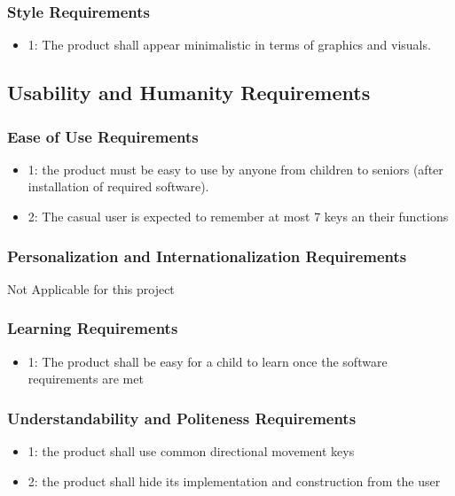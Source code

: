 \documentclass[12pt]{article}
\begin{document}
\subsubsection*{Style Requirements}
\begin{itemize}
\item 1: The product shall appear minimalistic in terms of graphics and visuals.
\end{itemize}

\subsection{Usability and Humanity Requirements}
\subsubsection*{Ease of Use Requirements}
\begin{itemize}
\item 1: the product must be easy to use by anyone from children to seniors (after installation of required software).
\item 2:  The casual user is expected to remember at most 7 keys an their functions
\end{itemize}

\subsubsection*{Personalization and Internationalization Requirements}
Not Applicable for this project

\subsubsection*{Learning Requirements}
\begin{itemize}
\item 1: The product shall be easy for a child to learn once the software requirements are met
\end{itemize}

\subsubsection*{Understandability and Politeness Requirements}
\begin{itemize}
\item 1: the product shall use common directional movement keys
\item 2: the product shall hide its implementation and construction from the user
\end{itemize}
\end{document}
